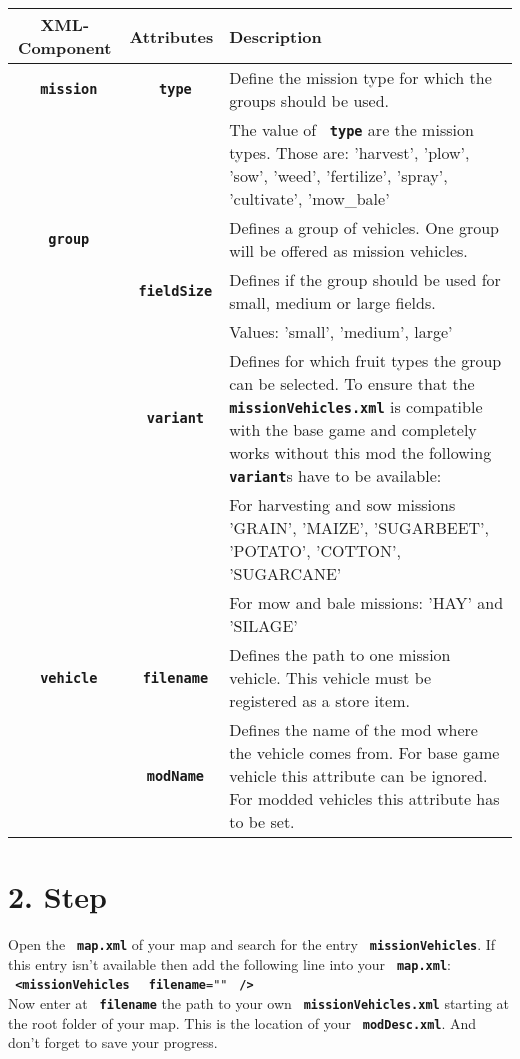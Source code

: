 \documentclass[a4paper]{scrartcl}
\newcommand{\XML}[1]{\texttt{\textbf{\color{pblue} #1}}}
\newcommand{\Attr}[1]{\texttt{\textbf{\color{pgreen} #1}}}
\newcommand{\Datei}[1]{\texttt{\textbf{\color{datei} #1}}}
\begin{document}
	\begin{tabular}{c|c|p{9cm}}
		\textbf{XML-Component} & \textbf{Attributes} & \textbf{Description}\\
		\hline
		\XML{mission} & \Attr{type} & Define the mission type for which the groups should be used.\\
		& & The value of \Attr{type} are the mission types. Those are: 'harvest', 'plow', 'sow', 'weed', 'fertilize', 'spray', 'cultivate', 'mow\_bale'\\
		\hline
		\XML{group} & & Defines a group of vehicles. One group will be offered as mission vehicles.\\
		\hdashline
		& \Attr{fieldSize} & Defines if the group should be used for small, medium or large fields.\\
		& & Values: 'small', 'medium', large'\\
		\hdashline
		& \Attr{variant} &
			Defines for which fruit types the group can be selected.
			To ensure that the \Datei{missionVehicles.xml} is compatible with the base game and completely works without this mod the following \XML{variant}s have to be available:\\
		& & For harvesting and sow missions 'GRAIN', 'MAIZE', 'SUGARBEET', 'POTATO', 'COTTON', 'SUGARCANE'\\
		& & For mow and bale missions: 'HAY' and 'SILAGE'\\
		\hline
		\XML{vehicle} & \Attr{filename} & Defines the path to one mission vehicle. This vehicle must be registered as a store item.\\
		\hdashline
		& \Attr{modName} & Defines the name of the mod where the vehicle comes from. For base game vehicle this attribute can be ignored. For modded vehicles this attribute has to be set.
	\end{tabular}

	\section*{2. Step}
	Open the \Datei{map.xml} of your map and search for the entry \XML{missionVehicles}. If this entry isn't available then add the following line into your \Datei{map.xml}:\\
	\XML{<missionVehicles } \Attr{filename}\texttt{="}\texttt{"} \XML{/>}\\
	Now enter at \Attr{filename} the path to your own \Datei{missionVehicles.xml} starting at the root folder of your map. This is the location of your \Datei{modDesc.xml}. And don't forget to save your progress.
\end{document}

